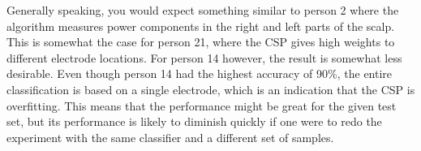 \npar

Generally speaking, you would expect something similar to person 2 where the algorithm measures power components in the right and left parts of the scalp. This is somewhat the case for person 21, where the CSP gives high weights to different electrode locations. For person 14 however, the result is somewhat less desirable. Even though person 14 had the highest accuracy of 90\%, the entire classification is based on a single electrode, which is an indication that the CSP is overfitting. This means that the performance might be great for the given test set, but its performance is likely to diminish quickly if one were to redo the experiment with the same classifier and a different set of samples. 

